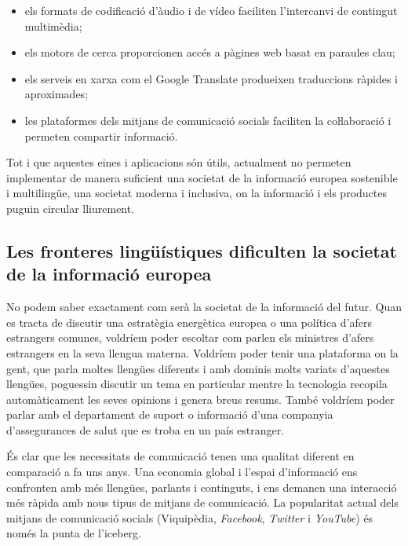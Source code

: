 \begin{multicols}{2}
\begin{itemize}
\item els formats de codificació d’àudio i de vídeo faciliten l’intercanvi de contingut multimèdia;
\item els motors de cerca proporcionen accés a pàgines web basat en paraules clau;
\item els serveis en xarxa com el Google Translate produeixen traduccions ràpides i aproximades;
\item les plataformes dels mitjans de comunicació socials faciliten la coŀlaboració i permeten compartir informació.
\end{itemize}
Tot i que aquestes eines i aplicacions són útils, actualment no permeten implementar de manera suficient una societat de la informació europea sostenible i multilingüe, una societat moderna i inclusiva, on la informació i els productes puguin circular lliurement.

\subsection{Les fronteres lingüístiques dificulten la societat de la informació europea}
  
No podem saber exactament com serà la societat de la informació del futur. Quan es tracta de discutir una estratègia energètica europea o una política d’afers estrangers comunes, voldríem poder escoltar com parlen els ministres d’afers estrangers en la seva llengua materna. Voldríem poder tenir una plataforma on la gent, que parla moltes llengües diferents i amb dominis molts variats d’aquestes llengües, poguessin discutir un tema en particular mentre la tecnologia recopila automàticament les seves opinions i genera breus resums. També voldríem poder parlar amb el departament de suport o informació d’una companyia d’assegurances de salut que es troba en un país estranger.


És clar que les necessitats de comunicació tenen una qualitat diferent en comparació a fa uns anys. Una economia global i l’espai d’informació ens confronten amb més llengües, parlants i continguts, i ens demanen una interacció més ràpida amb nous tipus de mitjans de comunicació. La popularitat actual dels mitjans de comunicació socials (Viquipèdia, \textit{Facebook}, \textit{Twitter} i \textit{YouTube}) és només la punta de l’iceberg. 


\end{multicols}
